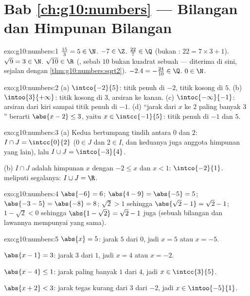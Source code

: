 \section*{Bab \ref{ch:g10:numbers} --- Bilangan dan Himpunan Bilangan}

\begin{solution}{exo:g10:numbers:1}
$\frac{15}{3} = 5 \in \N$. \quad $-7 \in \Z$. \quad
$\frac{22}{7} \in \Q$ (bukan : $22 = 7 \times 3 + 1$).
\quad $\sqrt 9 = 3 \in \N$. \quad $\sqrt{10} \in \R$ (, sebab
$10$ bukan kuadrat sebuah  --- diterima di sini, sejalan
dengan \cref{thm:g10:numbers:sqrt2}). \quad $-2.4 = -\frac{24}{10} \in \Q$.
\quad $0 \in \N$.
\end{solution}

\begin{solution}{exo:g10:numbers:2}
(a) $\intco{-2}{5}$: titik penuh di $-2$, titik kosong di $5$.
(b) $\intoo{3}{+\infty}$: titik kosong di $3$, arsiran ke kanan.
(c) $\intoc{-\infty}{-1}$: arsiran dari kiri sampai titik penuh di
$-1$.
(d) ``jarak dari $x$ ke $2$ paling banyak $3$'' berarti $\abs{x - 2} \leq 3$,
yaitu $x \in \intcc{-1}{5}$: titik penuh di $-1$ dan $5$.
\end{solution}

\begin{solution}{exo:g10:numbers:3}
(a) Kedua  bertumpang tindih antara $0$ dan $2$:
$I \cap J = \intcc{0}{2}$ ($0 \in J$ dan $2 \in I$, dan keduanya juga
anggota himpunan yang lain), lalu $I \cup J = \intco{-3}{4}$.

(b) $I \cap J$ adalah himpunan $x$ dengan $-2 \leq x$ dan $x < 1$:
$\intco{-2}{1}$.  meliputi segalanya: $I \cup J = \R$.
\end{solution}

\begin{solution}{exo:g10:numbers:4}
$\abs{-6} = 6$; \quad $\abs{4 - 9} = \abs{-5} = 5$; \quad
$\abs{-3 - 5} = \abs{-8} = 8$; \quad
$\sqrt 2 > 1$ sehingga $\abs{\sqrt2 - 1} = \sqrt2 - 1$; \quad
$1 - \sqrt2 < 0$ sehingga $\abs{1 - \sqrt2} = \sqrt2 - 1$ juga (sebuah
bilangan dan lawannya mempunyai  yang sama).
\end{solution}

\begin{solution}{exo:g10:numbers:5}
$\abs{x} = 5$: jarak $5$ dari $0$, jadi $x = 5$ atau $x = -5$.

$\abs{x - 1} = 3$: jarak $3$ dari $1$, jadi $x = 4$ atau $x = -2$.

$\abs{x - 4} \leq 1$: jarak paling banyak $1$ dari $4$, jadi
$x \in \intcc{3}{5}$.

$\abs{x + 2} < 3$: jarak tegas kurang dari $3$ dari $-2$, jadi
$x \in \intoo{-5}{1}$.
\end{solution}

